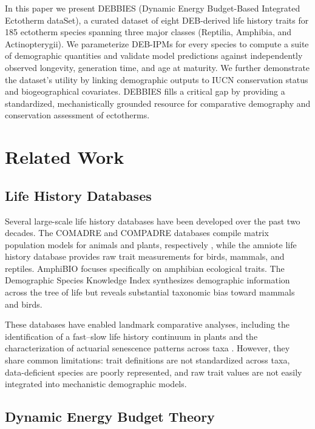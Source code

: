 \documentclass[11pt]{article}
\begin{document}
In this paper we present DEBBIES (Dynamic Energy Budget-Based Integrated Ectotherm dataSet), a curated dataset of eight DEB-derived life history traits for 185 ectotherm species spanning three major classes (Reptilia, Amphibia, and Actinopterygii). We parameterize DEB-IPMs for every species to compute a suite of demographic quantities and validate model predictions against independently observed longevity, generation time, and age at maturity. We further demonstrate the dataset's utility by linking demographic outputs to IUCN conservation status and biogeographical covariates. DEBBIES fills a critical gap by providing a standardized, mechanistically grounded resource for comparative demography and conservation assessment of ectotherms.

\section{Related Work}

\subsection{Life History Databases}

Several large-scale life history databases have been developed over the past two decades. The COMADRE and COMPADRE databases compile matrix population models for animals and plants, respectively \citep{salguero2016}, while the amniote life history database \citep{myhrvold2015} provides raw trait measurements for birds, mammals, and reptiles. AmphiBIO \citep{oliveira2017} focuses specifically on amphibian ecological traits. The Demographic Species Knowledge Index \citep{jones2014} synthesizes demographic information across the tree of life but reveals substantial taxonomic bias toward mammals and birds.

These databases have enabled landmark comparative analyses, including the identification of a fast--slow life history continuum in plants \citep{salguero2016} and the characterization of actuarial senescence patterns across taxa \citep{jones2014}. However, they share common limitations: trait definitions are not standardized across taxa, data-deficient species are poorly represented, and raw trait values are not easily integrated into mechanistic demographic models.

\subsection{Dynamic Energy Budget Theory}
\end{document}
